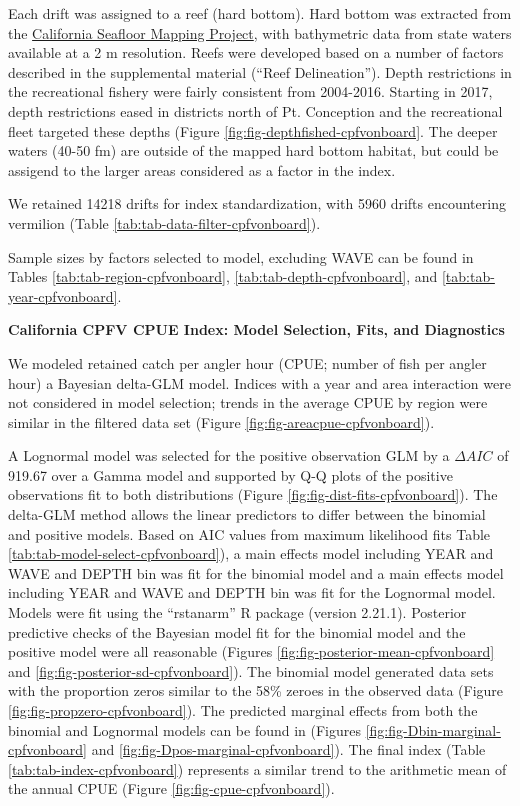 \documentclass[
  english,
  a4paper,
]{article}
\begin{document}
Each drift was assigned to a reef (hard bottom). Hard bottom was extracted from
the \href{http://seafloor.otterlabs.org/index.html}{California Seafloor Mapping Project},
with bathymetric data from state waters available at a 2 m resolution. Reefs were
developed based on a number of factors described in the supplemental material
(``Reef Delineation''). Depth restrictions in the recreational fishery were fairly
consistent from 2004-2016. Starting in 2017, depth restrictions eased in districts
north of Pt. Conception and the recreational fleet targeted these depths
(Figure \ref{fig:fig-depthfished-cpfvonboard}. The deeper waters (40-50 fm) are
outside of the mapped hard bottom habitat, but could be assigend to the larger
areas considered as a factor in the index.

We retained 14218 drifts for index standardization, with
5960 drifts encountering vermilion
(Table \ref{tab:tab-data-filter-cpfvonboard}).

Sample sizes by factors selected to model, excluding WAVE can be found in Tables
\ref{tab:tab-region-cpfvonboard}, \ref{tab:tab-depth-cpfvonboard}, and \ref{tab:tab-year-cpfvonboard}.

\textbf{California CPFV CPUE Index: Model Selection, Fits, and Diagnostics}

We modeled retained catch per angler hour (CPUE; number of fish per angler hour)
a Bayesian delta-GLM model. Indices with a year and area interaction were not
considered in model selection; trends in the average CPUE by region were similar
in the filtered data set (Figure \ref{fig:fig-areacpue-cpfvonboard}).

A Lognormal model was
selected for the positive observation GLM by
a \(\Delta AIC\) of 919.67 over a Gamma model and supported by Q-Q plots of the positive observations fit to both distributions (Figure \ref{fig:fig-dist-fits-cpfvonboard}). The delta-GLM
method allows the linear predictors to differ between the binomial and positive models.
Based on AIC values from maximum likelihood fits Table \ref{tab:tab-model-select-cpfvonboard}),
a main effects model including
YEAR and WAVE and DEPTH bin
was fit for the binomial model and a main
effects model including
YEAR and WAVE and DEPTH bin
was fit for the Lognormal model.
Models were fit using the ``rstanarm'' R package (version 2.21.1). Posterior predictive
checks of the Bayesian model fit for the binomial model and the positive model
were all reasonable (Figures \ref{fig:fig-posterior-mean-cpfvonboard} and
\ref{fig:fig-posterior-sd-cpfvonboard}). The binomial model generated data sets with the
proportion zeros similar to the 58\% zeroes in the observed data
(Figure \ref{fig:fig-propzero-cpfvonboard}). The predicted marginal effects from
both the binomial and Lognormal models can be found in (Figures \ref{fig:fig-Dbin-marginal-cpfvonboard} and \ref{fig:fig-Dpos-marginal-cpfvonboard}). The
final index (Table \ref{tab:tab-index-cpfvonboard})
represents a similar trend to the arithmetic mean of the annual CPUE (Figure \ref{fig:fig-cpue-cpfvonboard}).
\end{document}
